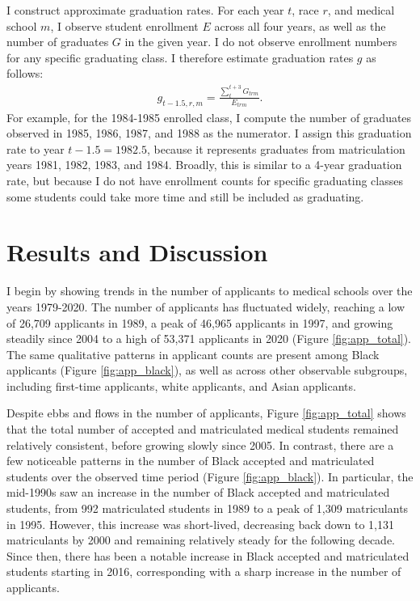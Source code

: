 \documentclass[12pt]{article}
\begin{document}
I construct approximate graduation rates. For each year $t$, race $r$, and medical school $m$, I observe student enrollment $E$ across all four years, as well as the number of graduates $G$ in the given year. I do not observe enrollment numbers for any specific graduating class. I therefore estimate graduation rates $g$ as follows: 
\begin{align}
g_{t-1.5,r,m} = \frac{\sum_t^{t+3} G_{trm}}{E_{trm}}.
\end{align}
For example, for the 1984-1985 enrolled class, I compute the number of graduates observed in 1985, 1986, 1987, and 1988 as the numerator. I assign this graduation rate to year $t-1.5 = 1982.5$, because it represents graduates from matriculation years 1981, 1982, 1983, and 1984. Broadly, this is similar to a 4-year graduation rate, but because I do not have enrollment counts for specific graduating classes some students could take more time and still be included as graduating.


\section{Results and Discussion} \label{sec:results}

I begin by showing trends in the number of applicants to medical schools over the years 1979-2020. The number of applicants has fluctuated widely, reaching a low of 26,709 applicants in 1989, a peak of 46,965 applicants in 1997, and growing steadily since 2004 to a high of 53,371 applicants in 2020 (Figure \ref{fig:app_total}). The same qualitative patterns in applicant counts are present among Black applicants (Figure \ref{fig:app_black}), as well as across other observable subgroups, including first-time applicants, white applicants, and Asian applicants. 

Despite ebbs and flows in the number of applicants, Figure \ref{fig:app_total} shows that the total number of accepted and matriculated medical students remained relatively consistent, before growing slowly since 2005. In contrast, there are a few noticeable patterns in the number of Black accepted and matriculated students over the observed time period (Figure \ref{fig:app_black}). In particular, the mid-1990s saw an increase in the number of Black accepted and matriculated students, from 992 matriculated students in 1989 to a peak of 1,309 matriculants in 1995. However, this increase was short-lived, decreasing back down to 1,131 matriculants by 2000 and remaining relatively steady for the following decade. Since then, there has been a notable increase in Black accepted and matriculated students starting in 2016, corresponding with a sharp increase in the number of applicants.
\end{document}
